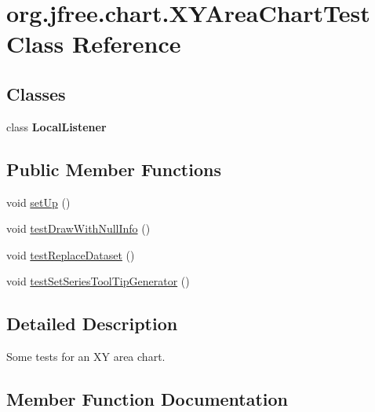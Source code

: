 \hypertarget{classorg_1_1jfree_1_1chart_1_1_x_y_area_chart_test}{}\section{org.\+jfree.\+chart.\+X\+Y\+Area\+Chart\+Test Class Reference}
\label{classorg_1_1jfree_1_1chart_1_1_x_y_area_chart_test}
\subsection*{Classes}
\begin{DoxyCompactItemize}
\item 
class {\bfseries Local\+Listener}
\end{DoxyCompactItemize}
\subsection*{Public Member Functions}
\begin{DoxyCompactItemize}
\item 
void \mbox{\hyperlink{classorg_1_1jfree_1_1chart_1_1_x_y_area_chart_test_a127727de6fca702eb2116225b0f5af95}{set\+Up}} ()
\item 
void \mbox{\hyperlink{classorg_1_1jfree_1_1chart_1_1_x_y_area_chart_test_a5b3e103c93fc0ca2e2afff1963725d93}{test\+Draw\+With\+Null\+Info}} ()
\item 
void \mbox{\hyperlink{classorg_1_1jfree_1_1chart_1_1_x_y_area_chart_test_ab8b5d22e1d60a55f4c6bb480ba34af3e}{test\+Replace\+Dataset}} ()
\item 
void \mbox{\hyperlink{classorg_1_1jfree_1_1chart_1_1_x_y_area_chart_test_ad016f7ec093632c08651b6fb73e82e8a}{test\+Set\+Series\+Tool\+Tip\+Generator}} ()
\end{DoxyCompactItemize}


\subsection{Detailed Description}
Some tests for an XY area chart. 

\subsection{Member Function Documentation}
\mbox{\label{classorg_1_1jfree_1_1chart_1_1_x_y_area_chart_test_a127727de6fca702eb2116225b0f5af95}} 
